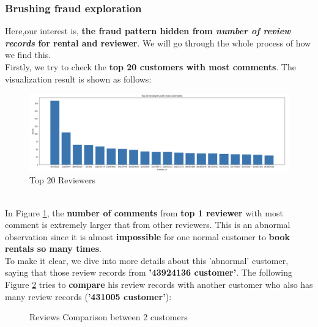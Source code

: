 \documentclass{article}
\begin{document}
	\subsubsection{Brushing fraud exploration}
	Here,our interest is, \textbf{the fraud pattern hidden from \textit{number of review records} for rental and reviewer}. We will go through the whole process of how we find this. 
	\vspace{3pt}
	\\
	Firstly, we try to check the\textbf{ top 20 customers with most comments}. The visualization result is shown as follows:
	\begin{figure}[h]
		\centering
		\includegraphics[width=.6\textheight]{top_20_reviewers.png}
		\caption{Top 20 Reviewers}
		\label{fig:009}
	\end{figure}
	\\
	In Figure \ref{fig:009}, the \textbf{number of comments} from\textbf{ top 1 reviewer} with most comment is extremely larger that from other reviewers. This is an abnormal observation since it is almost \textbf{impossible} for one normal customer to \textbf{book rentals so many times}.
	\vspace{3pt}
	\\
	To make it clear, we dive into more details about this 'abnormal' customer, saying that those review records from \textbf{'43924136 customer'}. The following Figure \ref{fig:010} tries to \textbf{compare }his review records with another customer who also has many review records (\textbf{'431005 customer'}):
	\begin{figure}[h]
		\centering
		\caption{Reviews Comparison between 2 customers}
		\label{fig:010} %
	\end{figure}
\end{document}
